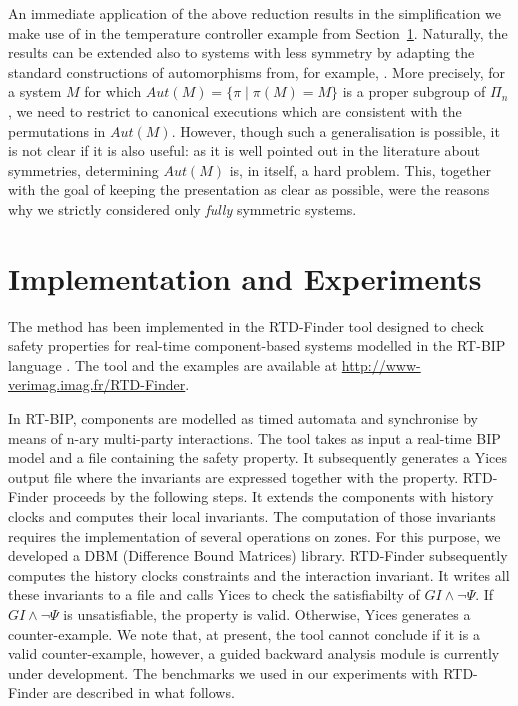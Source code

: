 \documentclass{LMCS}
\theoremstyle{plain}\newtheorem{remark}[thm]{Remark}
\theoremstyle{plain}\newtheorem{example}[thm]{Example}
\begin{document}
An immediate application of the above reduction results in the
simplification we make use of in the temperature controller example
from Section~\ref{sec:impl}. Naturally, the results can be extended
also to systems with less symmetry by adapting the standard
constructions of automorphisms from, for example,
\cite{emersonS96}. More precisely, for a system $M$ for which $Aut(M)
= \{\pi \mid \pi(M) = M\}$ is a proper subgroup of $\Pi_n$, we need to
restrict to canonical executions which are consistent with the
permutations in $Aut(M)$. However, though such a generalisation is
possible, it is not clear if it is also useful: as it is well pointed
out in the literature about symmetries, determining $Aut(M)$ is, in
itself, a hard problem. This, together with the goal of keeping the
presentation as clear as possible, were the reasons why we strictly
considered only \textit{fully} symmetric systems.








\newcommand{\rodn}[1]{\mathit{Rod}_#1}

\section{Implementation and Experiments}
\label{sec:impl}

The method has been implemented in the RTD-Finder tool designed to
check safety properties for real-time component-based systems modelled
in the RT-BIP language \cite{rtbip11}.  The tool and the examples are
available at \url{http://www-verimag.imag.fr/RTD-Finder}.  

In RT-BIP, components are modelled as timed automata and synchronise
by means of n-ary multi-party interactions. The tool takes as input a
real-time BIP model and a file containing the safety property. It
subsequently generates a Yices \cite{yices} output file where the
invariants are expressed together with the property. RTD-Finder
proceeds by the following steps. It extends the components with
history clocks and computes their local invariants. The computation of
those invariants requires the implementation of several operations on
zones. For this purpose, we developed a DBM (Difference Bound
Matrices) library. RTD-Finder subsequently computes the history clocks
constraints and the interaction invariant. It writes all these
invariants to a file and calls Yices to check the satisfiabilty of $GI
\wedge \neg \Psi$.  If $GI \wedge \neg \Psi$ is unsatisfiable, the
property is valid. Otherwise, Yices generates a counter-example. We
note that, at present, the tool cannot conclude if it is a valid
counter-example, however, a guided backward analysis module is
currently under development. The benchmarks we used in our experiments
with RTD-Finder are described in what follows.
\end{document}
